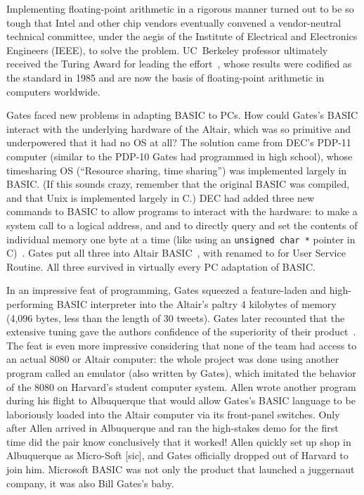   \begin{tangent}
  Implementing
  floating-point arithmetic in a rigorous manner turned out to be so tough that Intel 
  and other chip vendors eventually convened a vendor-neutral technical committee,
  under the aegis of the Institute of Electrical and 
  Electronics Engineers (IEEE), to solve the problem.
  UC~Berkeley professor 
  ultimately received the 
  Turing Award for
  leading the effort~\cite{kahan_interview}, whose results were codified as
  the  standard in 1985 and are now
  the basis of floating-point arithmetic in computers worldwide.
  \end{tangent}

  \begin{tangent}

Gates faced new problems in adapting BASIC to PCs.
How could Gates's BASIC interact with the underlying hardware of the
Altair, which was so primitive and underpowered that it had no OS at all?
The solution came from 
DEC's PDP-11 computer (similar to the PDP-10 Gates had
programmed in high school), whose
timesharing OS  (``Resource sharing, time
sharing'') was implemented largely in BASIC.  (If this sounds crazy,
remember that the original BASIC was compiled, and that 
   Unix is implemented largely in C.)  DEC had added
three new commands to BASIC to allow programs to interact with the 
hardware:  to make a system call to a logical address,
and  and  to directly query and set the contents of individual memory
one byte at a time (like using an \texttt{unsigned char~*}
pointer in C)~\cite[pp.~204--205]{ceruzzi}.
Gates put all three into Altair BASIC~\cite{smithsonian_interview},
with  renamed to  for User Service Routine.  All three
survived in virtually every PC adaptation of BASIC.
  \end{tangent}

In an impressive feat of programming, Gates squeezed a feature-laden
and high-performing BASIC interpreter into the Altair's paltry 4 kilobytes of memory
(4,096 bytes, less than the length of 30 tweets).
Gates later recounted that the extensive tuning gave the authors
confidence of the superiority of their
product~\cite{programmers_at_work}.
The feat is even more impressive considering that none of the team had
access to an actual 8080 or Altair computer: the whole project was
done using another program called an emulator (also written by Gates),
which imitated the behavior of the 8080 on Harvard's student computer
system.  Allen wrote another program during his flight to Albuquerque
that would allow Gates's BASIC language to be laboriously loaded into
the Altair computer via its front-panel switches.
Only after Allen arrived in Albuquerque and ran the high-stakes demo
for the first time did the pair know conclusively that it worked!
Allen quickly set up shop in Albuquerque as Micro-Soft [sic], and
Gates officially dropped out of Harvard to join him.
Microsoft BASIC was not only the product that launched a juggernaut
company, it was also Bill Gates's baby.

